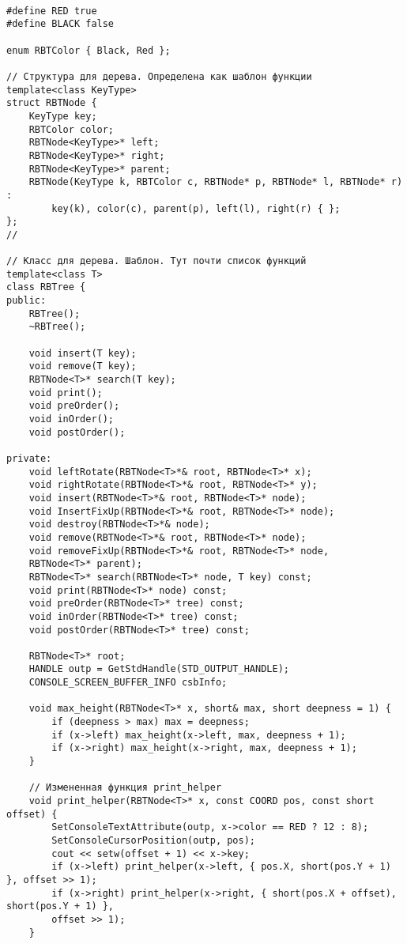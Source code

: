 \documentclass[bachelor, och, referat, times]{SCWorks}
\begin{document}
    \begin{verbatim}
   
#define RED true
#define BLACK false

enum RBTColor { Black, Red };

// Структура для дерева. Определена как шаблон функции
template<class KeyType>
struct RBTNode {
    KeyType key;
    RBTColor color;
    RBTNode<KeyType>* left;
    RBTNode<KeyType>* right;
    RBTNode<KeyType>* parent;
    RBTNode(KeyType k, RBTColor c, RBTNode* p, RBTNode* l, RBTNode* r) :
        key(k), color(c), parent(p), left(l), right(r) { };
};
//

// Класс для дерева. Шаблон. Тут почти список функций 
template<class T>
class RBTree {
public:
    RBTree();
    ~RBTree();

    void insert(T key);
    void remove(T key);
    RBTNode<T>* search(T key);
    void print();
    void preOrder();
    void inOrder();
    void postOrder();

private:
    void leftRotate(RBTNode<T>*& root, RBTNode<T>* x);
    void rightRotate(RBTNode<T>*& root, RBTNode<T>* y);
    void insert(RBTNode<T>*& root, RBTNode<T>* node);
    void InsertFixUp(RBTNode<T>*& root, RBTNode<T>* node);
    void destroy(RBTNode<T>*& node);
    void remove(RBTNode<T>*& root, RBTNode<T>* node);
    void removeFixUp(RBTNode<T>*& root, RBTNode<T>* node, 
    RBTNode<T>* parent);
    RBTNode<T>* search(RBTNode<T>* node, T key) const;
    void print(RBTNode<T>* node) const;
    void preOrder(RBTNode<T>* tree) const;
    void inOrder(RBTNode<T>* tree) const;
    void postOrder(RBTNode<T>* tree) const;

    RBTNode<T>* root;
    HANDLE outp = GetStdHandle(STD_OUTPUT_HANDLE);
    CONSOLE_SCREEN_BUFFER_INFO csbInfo;

    void max_height(RBTNode<T>* x, short& max, short deepness = 1) {
        if (deepness > max) max = deepness;
        if (x->left) max_height(x->left, max, deepness + 1);
        if (x->right) max_height(x->right, max, deepness + 1);
    }

    // Измененная функция print_helper
    void print_helper(RBTNode<T>* x, const COORD pos, const short offset) {
        SetConsoleTextAttribute(outp, x->color == RED ? 12 : 8);
        SetConsoleCursorPosition(outp, pos);
        cout << setw(offset + 1) << x->key;
        if (x->left) print_helper(x->left, { pos.X, short(pos.Y + 1) }, offset >> 1);
        if (x->right) print_helper(x->right, { short(pos.X + offset), short(pos.Y + 1) }, 
        offset >> 1);
    }


\end{verbatim}
\end{document}
